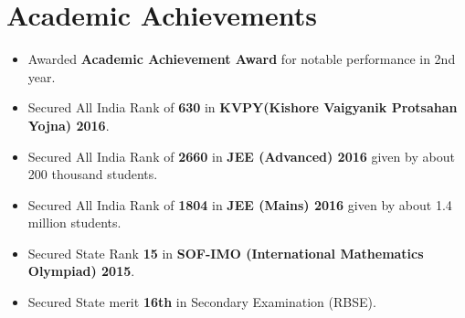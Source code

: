 \section*{Academic Achievements}
\begin{itemize}

\setlength\itemsep{0pt}
\item Awarded \textbf{Academic Achievement Award} for notable performance in 2nd year.
\item Secured All India Rank of {\bf 630} in {\bf KVPY(Kishore Vaigyanik Protsahan Yojna) 2016}.
\item Secured All India Rank of {\bf 2660} in {\bf JEE (Advanced) 2016} given by about 200 thousand students.
\item Secured All India Rank of {\bf 1804} in {\bf JEE (Mains) 2016} given by about 1.4 million students.
\item Secured State Rank {\bf 15} in {\bf SOF-IMO (International Mathematics Olympiad) 2015}.
\item Secured State merit {\bf 16th} in Secondary Examination (RBSE).

\end{itemize}
